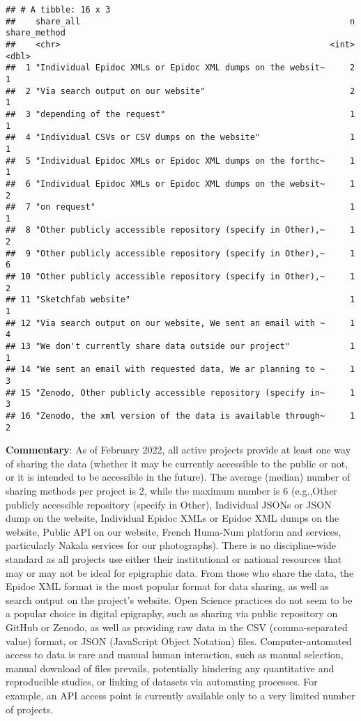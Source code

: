 \documentclass[
]{article}
\begin{document}
\begin{verbatim}
## # A tibble: 16 x 3
##    share_all                                                      n share_method
##    <chr>                                                      <int>        <dbl>
##  1 "Individual Epidoc XMLs or Epidoc XML dumps on the websit~     2            1
##  2 "Via search output on our website"                             2            1
##  3 "depending of the request"                                     1            1
##  4 "Individual CSVs or CSV dumps on the website"                  1            1
##  5 "Individual Epidoc XMLs or Epidoc XML dumps on the forthc~     1            1
##  6 "Individual Epidoc XMLs or Epidoc XML dumps on the websit~     1            2
##  7 "on request"                                                   1            1
##  8 "Other publicly accessible repository (specify in Other),~     1            2
##  9 "Other publicly accessible repository (specify in Other),~     1            6
## 10 "Other publicly accessible repository (specify in Other),~     1            2
## 11 "Sketchfab website"                                            1            1
## 12 "Via search output on our website, We sent an email with ~     1            4
## 13 "We don't currently share data outside our project"            1            1
## 14 "We sent an email with requested data, We ar planning to ~     1            3
## 15 "Zenodo, Other publicly accessible repository (specify in~     1            3
## 16 "Zenodo, the xml version of the data is available through~     1            2
\end{verbatim}

\textbf{Commentary}: As of February 2022, all active projects provide at
least one way of sharing the data (whether it may be currently
accessible to the public or not, or it is intended to be accessible in
the future). The average (median) number of sharing methods per project
is 2, while the maximum number is 6 (e.g.,Other publicly accessible
repository (specify in Other), Individual JSONs or JSON dump on the
website, Individual Epidoc XMLs or Epidoc XML dumps on the website,
Public API on our website, French Huma-Num platform and services,
particularly Nakala services for our photographs). There is no
discipline-wide standard as all projects use either their institutional
or national resources that may or may not be ideal for epigraphic data.
From those who share the data, the Epidoc XML format is the most popular
format for data sharing, as well as search output on the project's
website. Open Science practices do not seem to be a popular choice in
digital epigraphy, such as sharing via public repository on GitHub or
Zenodo, as well as providing raw data in the CSV (comma-separated value)
format, or JSON (JavaScript Object Notation) files. Computer-automated
access to data is rare and manual human interaction, such as manual
selection, manual download of files prevails, potentially hindering any
quantitative and reproducible studies, or linking of datasets via
automating processes. For example, an API access point is currently
available only to a very limited number of projects.
\end{document}
